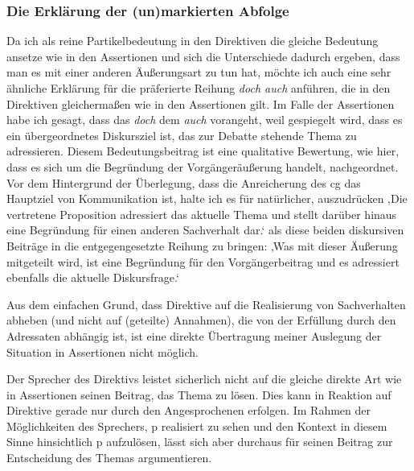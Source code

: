 \subsubsection{Die Erklärung der (un)markierten Abfolge}
Da ich als reine Partikelbedeutung in den Direktiven die gleiche Bedeutung ansetze wie in den Assertionen und sich die Unterschiede dadurch ergeben, dass man es mit einer anderen Äußerungsart zu tun hat, möchte ich auch eine sehr ähnliche Erklärung für die präferierte Reihung \textit{doch auch} anführen, die in den Direktiven gleichermaßen wie in den Assertionen gilt. Im Falle der Assertionen habe ich gesagt, dass das \textit{doch} dem \textit{auch} vorangeht, weil gespiegelt wird, dass es ein übergeordnetes Diskursziel ist, das zur Debatte stehende Thema zu adressieren. Diesem Bedeutungsbeitrag ist eine qualitative Bewertung, wie hier, dass es sich um die Begründung der Vorgängeräußerung handelt, nachgeordnet. Vor dem Hintergrund der Überlegung, dass die Anreicherung des cg das Hauptziel von Kommunikation ist, halte ich es für natürlicher, auszudrücken ‚Die vertretene Proposition adressiert das aktuelle Thema und stellt darüber hinaus eine Begründung für einen anderen Sachverhalt dar.‘ als diese beiden diskursiven Beiträge in die entgegengesetzte Reihung zu bringen: ‚Was mit dieser Äußerung mitgeteilt wird, ist eine Begründung für den Vorgängerbeitrag und es adressiert ebenfalls die aktuelle Diskursfrage.‘

Aus dem einfachen Grund, dass Direktive auf die Realisierung von Sachverhalten abheben (und nicht auf (geteilte) Annahmen), die von der Erfüllung durch den Adressaten abhängig ist, ist eine direkte Übertragung meiner Auslegung der Situation in Assertionen nicht möglich. 

Der Sprecher des Direktivs leistet sicherlich nicht auf die gleiche direkte Art wie in Assertionen seinen Beitrag, das Thema zu lösen. Dies kann in Reaktion auf Direktive gerade nur durch den Angesprochenen erfolgen. Im Rahmen der Möglichkeiten des Sprechers, p realisiert zu sehen und den Kontext in diesem Sinne hinsichtlich p aufzulösen, lässt sich aber durchaus für seinen Beitrag zur Entscheidung des Themas argumentieren. 

